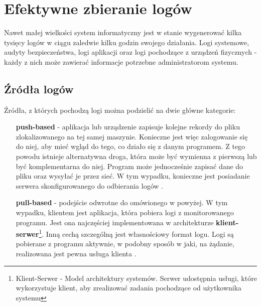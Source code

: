 \section{Efektywne zbieranie logów}
\label{chapter:logs:collecting}

    Nawet małej wielkości system informatyczny jest w stanie wygenerować kilka tysięcy logów w ciągu
    zaledwie kilku godzin swojego działania. Logi systemowe, audyty bezpieczeństwa, logi aplikacji oraz
    logi pochodzące z urządzeń fizycznych - każdy z nich może zawierać informacje potrzebne
    administratorom systemu. 
    
    \subsection{Źródła logów}
    \label{chapter:logs:collecting:source}
    Źródła, z których pochodzą logi można podzielić na dwie główne kategorie:
    \begin{itemize}
        \item[\textbf{push-based}]
            - aplikacja lub urządzenie zapisuje kolejne rekordy do pliku zlokalizowanego
            na tej samej maszynie. Konieczne jest więc zalogowanie się do niej, aby 
            mieć wgląd do tego, co działo się z danym programem. Z tego powodu istnieje
            alternatywna droga, która może być wymienna z pierwszą lub być komplementarna do niej.
            Program może jednocześnie zapisać dane do pliku oraz wysyłać je przez sieć. W tym
            wypadku, konieczne jest posiadanie serwera skonfigurowanego do odbierania logów 
            \cite{logging_log_management}.
        \item[\textbf{pull-based}]
            - podejście odwrotne do omówionego w powyżej. W tym wypadku,
            klientem jest aplikacja, która pobiera logi z monitorowanego programu. Jest ona najczęściej
            implementowana w architekturze \textbf{klient-serwer}\footnote{Klient-Serwer - Model architektury
                systemów. Serwer udostępnia usługi, które wykorzystuje klient, aby zrealizować zadania
                pochodzące od użytkownika systemu}. Inną cechą szczególną jest własnościowy format logu.
            Logi są pobierane z programu aktywnie, w podobny sposób w jaki, na żądanie, realizowana
            jest pewna usługa klienta \cite{logging_log_management}.
    \end{itemize}
    
